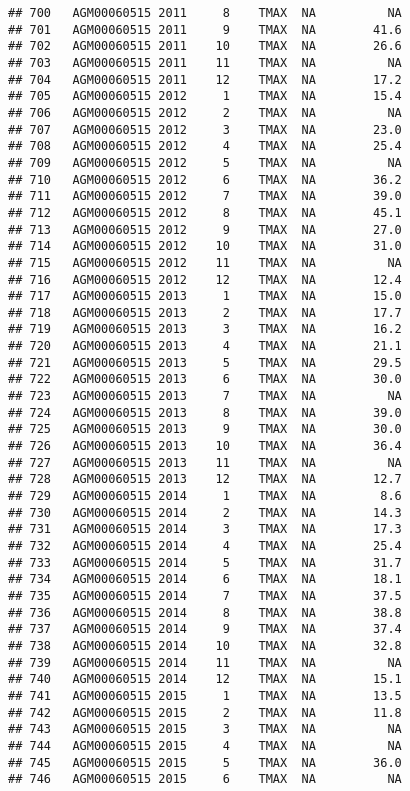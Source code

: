 \documentclass{article}\usepackage[]{graphicx}\usepackage[]{color}
\makeatletter
\newenvironment{kframe}{%
 \def\at@end@of@kframe{}%
 \ifinner\ifhmode%
  \def\at@end@of@kframe{\end{minipage}}%
  \begin{minipage}{\columnwidth}%
 \fi\fi%
 \def\FrameCommand##1{\hskip\@totalleftmargin \hskip-\fboxsep
 \colorbox{shadecolor}{##1}\hskip-\fboxsep
     \hskip-\linewidth \hskip-\@totalleftmargin \hskip\columnwidth}%
 \MakeFramed {\advance\hsize-\width
   \@totalleftmargin\z@ \linewidth\hsize
   \@setminipage}}%
 {\par\unskip\endMakeFramed%
 \at@end@of@kframe}
\newenvironment{knitrout}{}{} %
\makeatother
\begin{document}
\begin{knitrout}
\begin{kframe}
\begin{verbatim}
## 700   AGM00060515 2011     8    TMAX  NA          NA
## 701   AGM00060515 2011     9    TMAX  NA        41.6
## 702   AGM00060515 2011    10    TMAX  NA        26.6
## 703   AGM00060515 2011    11    TMAX  NA          NA
## 704   AGM00060515 2011    12    TMAX  NA        17.2
## 705   AGM00060515 2012     1    TMAX  NA        15.4
## 706   AGM00060515 2012     2    TMAX  NA          NA
## 707   AGM00060515 2012     3    TMAX  NA        23.0
## 708   AGM00060515 2012     4    TMAX  NA        25.4
## 709   AGM00060515 2012     5    TMAX  NA          NA
## 710   AGM00060515 2012     6    TMAX  NA        36.2
## 711   AGM00060515 2012     7    TMAX  NA        39.0
## 712   AGM00060515 2012     8    TMAX  NA        45.1
## 713   AGM00060515 2012     9    TMAX  NA        27.0
## 714   AGM00060515 2012    10    TMAX  NA        31.0
## 715   AGM00060515 2012    11    TMAX  NA          NA
## 716   AGM00060515 2012    12    TMAX  NA        12.4
## 717   AGM00060515 2013     1    TMAX  NA        15.0
## 718   AGM00060515 2013     2    TMAX  NA        17.7
## 719   AGM00060515 2013     3    TMAX  NA        16.2
## 720   AGM00060515 2013     4    TMAX  NA        21.1
## 721   AGM00060515 2013     5    TMAX  NA        29.5
## 722   AGM00060515 2013     6    TMAX  NA        30.0
## 723   AGM00060515 2013     7    TMAX  NA          NA
## 724   AGM00060515 2013     8    TMAX  NA        39.0
## 725   AGM00060515 2013     9    TMAX  NA        30.0
## 726   AGM00060515 2013    10    TMAX  NA        36.4
## 727   AGM00060515 2013    11    TMAX  NA          NA
## 728   AGM00060515 2013    12    TMAX  NA        12.7
## 729   AGM00060515 2014     1    TMAX  NA         8.6
## 730   AGM00060515 2014     2    TMAX  NA        14.3
## 731   AGM00060515 2014     3    TMAX  NA        17.3
## 732   AGM00060515 2014     4    TMAX  NA        25.4
## 733   AGM00060515 2014     5    TMAX  NA        31.7
## 734   AGM00060515 2014     6    TMAX  NA        18.1
## 735   AGM00060515 2014     7    TMAX  NA        37.5
## 736   AGM00060515 2014     8    TMAX  NA        38.8
## 737   AGM00060515 2014     9    TMAX  NA        37.4
## 738   AGM00060515 2014    10    TMAX  NA        32.8
## 739   AGM00060515 2014    11    TMAX  NA          NA
## 740   AGM00060515 2014    12    TMAX  NA        15.1
## 741   AGM00060515 2015     1    TMAX  NA        13.5
## 742   AGM00060515 2015     2    TMAX  NA        11.8
## 743   AGM00060515 2015     3    TMAX  NA          NA
## 744   AGM00060515 2015     4    TMAX  NA          NA
## 745   AGM00060515 2015     5    TMAX  NA        36.0
## 746   AGM00060515 2015     6    TMAX  NA          NA

\end{verbatim}
\end{kframe}
\end{knitrout}
\end{document}
